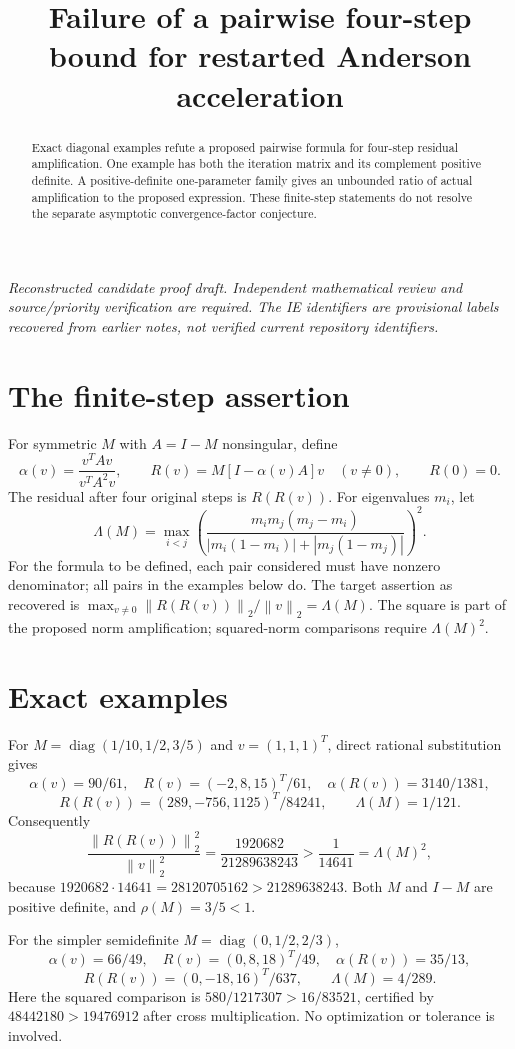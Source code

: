\documentclass[11pt]{article}
\title{Failure of a pairwise four-step bound for restarted Anderson acceleration}
\author{}
\date{}
\newcommand{\norm}[1]{\left\lVert#1\right\rVert}
\newcommand{\diag}{\operatorname{diag}}
\begin{document}
\maketitle
\noindent\textit{Reconstructed candidate proof draft. Independent mathematical review and source/priority verification are required. The IE identifiers are provisional labels recovered from earlier notes, not verified current repository identifiers.}


\begin{abstract}
Exact diagonal examples refute a proposed pairwise formula for four-step residual amplification. One example has both the iteration matrix and its complement positive definite. A positive-definite one-parameter family gives an unbounded ratio of actual amplification to the proposed expression. These finite-step statements do not resolve the separate asymptotic convergence-factor conjecture.
\end{abstract}
\section{The finite-step assertion}
For symmetric $M$ with $A=I-M$ nonsingular, define
\[
\alpha(v)=\frac{v^TAv}{v^TA^2v},\qquad R(v)=M[I-\alpha(v)A]v\quad(v\ne0),\qquad R(0)=0.
\]
The residual after four original steps is $R(R(v))$. For eigenvalues $m_i$, let
\[
\Lambda(M)=\max_{i<j}\left(\frac{m_im_j(m_j-m_i)}{|m_i(1-m_i)|+|m_j(1-m_j)|}\right)^2.
\]
For the formula to be defined, each pair considered must have nonzero denominator; all pairs in the examples below do. The target assertion as recovered is $\max_{v\ne0}\norm{R(R(v))}_2/\norm v_2=\Lambda(M)$. The square is part of the proposed norm amplification; squared-norm comparisons require $\Lambda(M)^2$.
\section{Exact examples}
For $M=\diag(1/10,1/2,3/5)$ and $v=(1,1,1)^T$, direct rational substitution gives
\[
\alpha(v)=90/61,\quad R(v)=(-2,8,15)^T/61,\quad \alpha(R(v))=3140/1381,
\]
\[
R(R(v))=(289,-756,1125)^T/84241,\qquad \Lambda(M)=1/121.
\]
Consequently
\[
\frac{\norm{R(R(v))}_2^2}{\norm v_2^2}=\frac{1920682}{21289638243}>\frac1{14641}=\Lambda(M)^2,
\]
because $1920682\cdot14641=28120705162>21289638243$. Both $M$ and $I-M$ are positive definite, and $\rho(M)=3/5<1$.

For the simpler semidefinite $M=\diag(0,1/2,2/3)$,
\[
\alpha(v)=66/49,\quad R(v)=(0,8,18)^T/49,\quad\alpha(R(v))=35/13,
\]
\[
R(R(v))=(0,-18,16)^T/637,\qquad\Lambda(M)=4/289.
\]
Here the squared comparison is $580/1217307>16/83521$, certified by $48442180>19476912$ after cross multiplication. No optimization or tolerance is involved.
\end{document}
